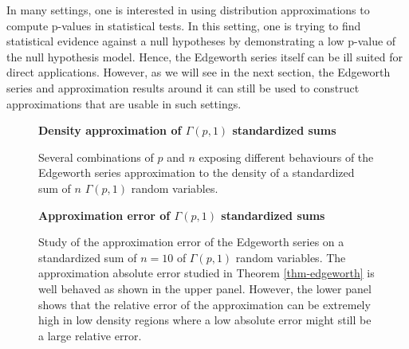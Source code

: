 \begin{example}
    In many settings, one is interested in using distribution approximations to compute p-values in statistical tests. In this setting, one is trying to find statistical evidence against a null hypotheses by demonstrating a low p-value of the null hypothesis model. Hence, the Edgeworth series itself can be ill suited for direct applications. However, as we will see in the next section, the Edgeworth series and approximation results around it can still be used to construct approximations that are usable in such settings.

    \begin{figure}[h]
        \textbf{Density approximation of $\Gamma(p,1)$ standardized sums}
        \centering
        \qquad
        \caption{Several combinations of $p$ and $n$ exposing different behaviours of the Edgeworth series approximation to the density of a standardized sum of $n$ $\Gamma(p, 1)$ random variables.}
        \label{fig-edgeworth}
    \end{figure}

    \begin{figure}[h]
        \textbf{Approximation error of $\Gamma(p,1)$ standardized sums}
        \centering
        \qquad
        \caption{Study of the approximation error of the Edgeworth series on a standardized sum of $n=10$ of $\Gamma(p, 1)$ random variables. The approximation absolute error studied in Theorem \ref{thm-edgeworth} is well behaved as shown in the upper panel. However, the lower panel shows that the relative error of the approximation can be extremely high in low density regions where a low absolute error might still be a large relative error.}
        \label{fig-edgeworth-err}
    \end{figure}
\end{example}